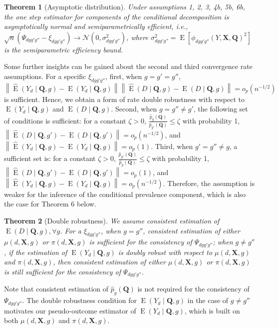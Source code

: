 \documentclass[12pt,a4paper]{article}
\newtheorem{prop}{Theorem}
\newcommand{\E}{\operatorname{E}}
\def\X{{\boldsymbol X}}
\def\Q{{\boldsymbol Q}}
\begin{document}
\begin{prop}[Asymptotic distribution]
Under assumptions 1, 2, 3, 4b, 5b, 6b, the one step estimator for components of the conditional decomposition is asymptotically normal and semiparametrically efficient, i.e., $\sqrt{n} \left( \Psi_{dgg'g''} - \xi_{dgg'g''} \right) \xrightarrow{} \mathcal{N}(0, \sigma^2_{dgg'g''})$, where $\sigma^2_{dgg'g''}=\E[\phi_{dgg'g''}(Y,\X,\Q)^2]$ is the semiparametric efficiency bound.
\end{prop}
Some further insights can be gained about the second and third convergence rate assumptions. For a specific $\xi_{dgg'g''}$, first, when $g=g'=g''$, $\left\| \hat{\E}\left( Y_d \mid \Q, g \right) - \E(Y_d \mid \Q,g)  \right\| \left\| \hat{\E}(D \mid \Q, g) - \E(D \mid \Q, g)  \right\| = o_p(n^{-1/2})$ is sufficient. Hence, we obtain a form of rate double robustness with respect to $\E(Y_d \mid \Q,g)$ and $\E(D \mid \Q, g)$. Second, when $g= g'' \neq g'$, the following set of conditions is sufficient: for a constant $\zeta>0$, $\frac{\hat{p}_g(\Q)}{\hat{p}_{g'}(\Q)} \leq \zeta$ with probability 1, $\left\| \hat{\E}(D \mid \Q, g') - \E(D \mid \Q, g') \right\|=o_p(n^{-1/2})$, and $ \left\| \hat{\E}\left( Y_d \mid \Q, g \right) - \E(Y_d \mid \Q,g) \right\|=o_p(1)$. Third, when $g'=g'' \neq g$, a sufficient set is: for a constant $\zeta>0$, $ \frac{\hat{p}_{g'}(\Q)}{\hat{p}_{g}(\Q)} \leq \zeta$ with probability 1, $\left\| \hat{\E}(D \mid \Q, g') - \E(D \mid \Q, g') \right\|=o_p(1)$, and $\left\| \hat{\E}\left( Y_d \mid \Q, g \right) - \E(Y_d \mid \Q,g)  \right\|=o_p(n^{-1/2})$. Therefore, the assumption is weaker for the inference of the conditional prevalence component, which is also the case for Theorem 6 below.

\begin{prop}[Double robustness]
We assume consistent estimation of $\E(D \mid \Q, g), \forall g$. For a $\xi_{dgg'g''}$, when $g=g''$, consistent estimation of either $\mu(d,\X,g)$ or $\pi(d,\X,g)$ is sufficient for the consistency of $\Psi_{dgg'g''}$; when $g \neq g''$, if the estimation of $\E(Y_d \mid \Q,g)$ is doubly robust with respect to $\mu(d,\X,g)$ and $\pi(d,\X,g)$, then consistent estimation of either $\mu(d,\X,g)$ or $\pi(d,\X,g)$ is still sufficient for the consistency of $\Psi_{dgg'g''}$.
\end{prop}
Note that consistent estimation of $\hat{p}_g(\Q)$ is not required for the consistency of $\Psi_{dgg'g''}$. The double robustness condition for $\E(Y_d \mid \Q,g)$ in the case of $g \neq g''$ motivates our pseudo-outcome estimator of $\E(Y_d \mid \Q,g)$, which is built on both $\mu(d,\X,g)$ and $\pi(d,\X,g)$.
\end{document}

